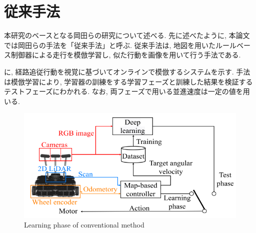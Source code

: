 
\section{従来手法}
本研究のベースとなる岡田らの研究について述べる. 先に述べたように, 本論文では岡田らの手法を「従来手法」と呼ぶ. 従来手法は, 地図を用いたルールベース制御器による走行を模倣学習し, 似た行動を画像を用いて行う手法である.\par
{}に, 経路追従行動を視覚に基づいてオンラインで模倣するシステムを示す. 手法は模倣学習により, 学習器の訓練をする学習フェーズと訓練した結果を検証するテストフェーズにわかれる. なお, 両フェーズで用いる並進速度は一定の値を用いる.

\vspace{3cm}

\begin{figure}[hbtp]
  \centering
 \includegraphics[keepaspectratio, scale=0.5]
      {images/imitation_sys.png}
 \caption{Learning phase of conventional method}
 \label{Fig:imitation_sys}
\end{figure}

\newpage

